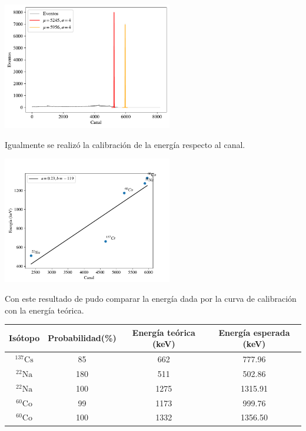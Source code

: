\documentclass[a4paper, onecolumn]{article}
\begin{document}
		\begin{center}
			\includegraphics[width=210pt]{img/hpge_co_60.pdf}
		\end{center}

		Igualmente se realizó la calibración de la energía respecto al canal.

		\begin{center}
			\includegraphics[width=210pt]{img/cal_hpge.pdf}
		\end{center}

		Con este resultado de pudo comparar la energía dada por la curva de calibración con la energía teórica.

		\begin{center}
			{\renewcommand{\arraystretch}{1.5}
			\renewcommand{\tabcolsep}{0.2cm}
			\begin{tabular}{ c c c c }
				\hline
				Isótopo & Probabilidad(\%) & Energía teórica (keV) & Energía esperada (keV) \\
				\hline
				${}^{137}\mathrm{Cs}$ & 85 & 662 & 777.96\\ 
				${}^{22}\mathrm{Na}$ & 180 & 511 & 502.86\\ 
				${}^{22}\mathrm{Na}$ & 100 & 1275 & 1315.91 \\ 
				${}^{60}\mathrm{Co}$ & 99 & 1173 & 999.76 \\ 
				${}^{60}\mathrm{Co}$ & 100 & 1332 & 1356.50
			\end{tabular}}
		\end{center}
\end{document}
